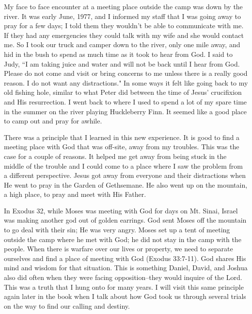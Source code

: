 \documentclass[oneside,12pt]{book}
\begin{document}
My face to face encounter at a meeting place outside the camp was down by the river. It was early June, 1977, and I informed my staff that I was going away to pray for a few days; I told them they wouldn't be able to communicate with me. If they had any emergencies they could talk with my wife and she would contact me. So I took our truck and camper down to the river, only one mile away, and hid in the bush to spend as much time as it took to hear from God. I said to Judy, ``I am taking juice and water and will not be back until I hear from God. Please do not come and visit or bring concerns to me unless there is a really good reason. I do not want any distractions." In some ways it felt like going back to my old fishing hole, similar to what Peter did between the time of Jesus' crucifixion and His resurrection. I went back to where I used to spend a lot of my spare time in the summer on the river playing Huckleberry Finn. It seemed like a good place to camp out and pray for awhile.

There was a principle that I learned in this new experience. It is good to find a meeting place with God that was off-site, away from my troubles. This was the case for a couple of reasons. It helped me get away from being stuck in the middle of the trouble and I could come to a place where I saw the problem from a different perspective. Jesus got away from everyone and their distractions when He went to pray in the Garden of Gethsemane. He also went up on the mountain, a high place, to pray and meet with His Father. 

In Exodus 32, while Moses was meeting with God for days on Mt. Sinai, Israel was making another god out of golden earrings. God sent Moses off the mountain to go deal with their sin;  He was very angry. Moses set up a tent of meeting outside the camp where he met with God; he did not stay in the camp with the people. When there is warfare over our lives or property, we need to separate ourselves and find a place of meeting with God (Exodus 33:7-11). God shares His mind and wisdom for that situation. This is something Daniel, David, and Joshua also did often when they were facing opposition--they would inquire of the Lord. This was a truth that I hung onto for many years. I will visit this same principle again later in the book when I talk about how God took us through several trials on the way to find our calling and destiny.
\end{document}
